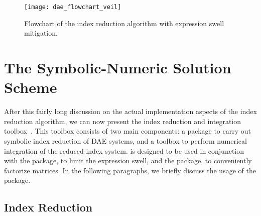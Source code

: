 \begin{sidewaysfigure}[htbp]
  \centering
  \texttt{[image: dae\_flowchart\_veil]}
  \caption{Flowchart of the index reduction algorithm with expression swell mitigation.}
  \label{chap4:fig:index_reduction_veil}
\end{sidewaysfigure}


\section{The Symbolic-Numeric Solution Scheme}
\label{chap4:sec:indigo}

After this fairly long discussion on the actual implementation aspects of the index reduction algorithm, we can now present the \Indigo{} index reduction and integration toolbox~\cite{indigo}. This toolbox consists of two main components: a \Maple{} package to carry out symbolic index reduction of \ac{DAE} systems, and a \Matlab{} toolbox to perform numerical integration of the reduced-index system. \Indigo{} is designed to be used in conjunction with the \LEM{} package, to limit the expression swell, and the \LAST{} package, to conveniently factorize matrices. In the following paragraphs, we briefly discuss the usage of the \Indigo{} package.

\subsection{Index Reduction}

